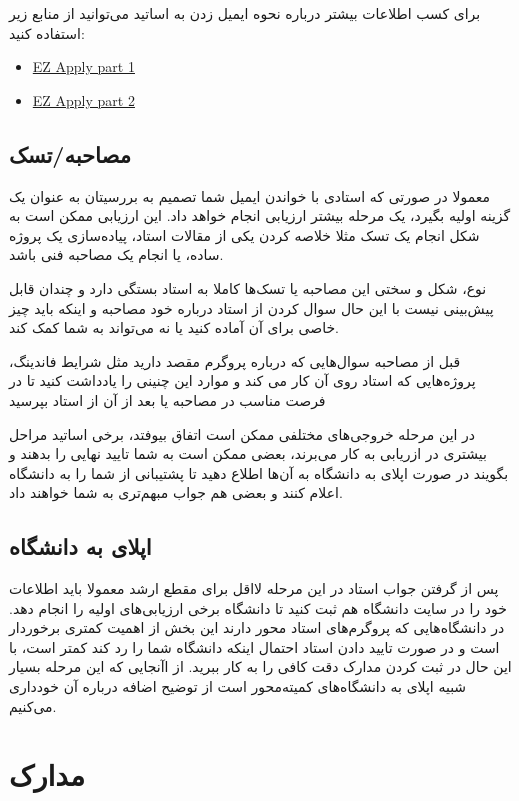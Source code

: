 برای کسب اطلاعات بیشتر درباره نحوه ایمیل زدن به اساتید می‌توانید از منابع زیر استفاده کنید:

\begin{itemize}
  \item \href{https://www.youtube.com/watch?v=xXZyZzW86LY}{EZ Apply part 1}
  \item \href{https://www.youtube.com/watch?v=m6Kr2Bf5zyk}{EZ Apply part 2}
\end{itemize}

\subsection{مصاحبه/تسک}
معمولا در صورتی که استادی با خواندن ایمیل شما تصمیم به بررسیتان به عنوان یک گزینه اولیه بگیرد، یک مرحله بیشتر ارزیابی انجام خواهد داد. 
این ارزیابی ممکن است به شکل انجام یک تسک مثلا خلاصه کردن یکی از مقالات استاد، پیاده‌سازی یک پروژه ساده، یا انجام یک مصاحبه فنی باشد. 

نوع، شکل و سختی این مصاحبه یا تسک‌ها کاملا به استاد بستگی دارد و چندان قابل پیش‌بینی نیست با این حال سوال کردن از استاد 
درباره خود مصاحبه و اینکه باید چیز خاصی برای آن آماده کنید یا نه می‌تواند به شما کمک کند. 

قبل از مصاحبه سوال‌هایی که درباره پروگرم مقصد دارید مثل شرایط فاندینگ، پروژه‌هایی که استاد روی آن کار می کند و موارد این چنینی را یادداشت کنید
تا در فرصت مناسب در مصاحبه یا بعد از آن از استاد بپرسید

در این مرحله خروجی‌های مختلفی ممکن است اتفاق بیوفتد، برخی اساتید مراحل بیشتری در ازریابی به کار می‌برند، بعضی ممکن است به شما تایید 
نهایی را بدهند و بگویند در صورت اپلای به دانشگاه به آن‌ها اطلاع دهید تا پشتیبانی از شما را به دانشگاه اعلام کنند و بعضی هم جواب مبهم‌تری به شما
خواهند داد. 

\subsection{اپلای به دانشگاه}
پس از گرفتن جواب استاد در این مرحله لااقل برای مقطع ارشد معمولا باید اطلاعات خود را در سایت دانشگاه هم ثبت کنید تا دانشگاه برخی 
ارزیابی‌های اولیه را انجام دهد. در دانشگاه‌هایی که پروگرم‌های استاد محور دارند این بخش از اهمیت کمتری برخوردار است و در صورت تایید دادن 
استاد احتمال اینکه دانشگاه شما را رد کند کمتر است، با این حال در ثبت کردن مدارک دقت کافی را به کار ببرید. 
از اآنجایی که این مرحله بسیار شبیه اپلای به دانشگاه‌های کمیته‌محور است از توضیح اضافه درباره آن خودداری می‌کنیم. 



\section{مدارک}\label{sec:admission-docs}

